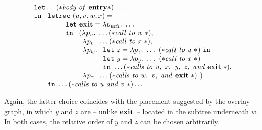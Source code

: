 \begin{description}
\begin{equation}
\begin{array}{l}
        \qquad \mathtt{let} \ldots (* \mathit{body\ of\ \entrynode}*)\ldots\\ 
        \qquad \mathtt{in}\
        \begin{array}[t]{l}
          \mathtt{letrec}\ (u,v,w,x) =\\
          \qquad \begin{array}[t]{l}
            \mathtt{let}\ \exitnode = 
            \lambda p_{\mathit{exit}}.\ \ldots\\
            \mathtt{in}\
            \begin{array}[t]{l}
              (%
              \lambda p_u.\ \ldots
              (*\mathit{call\ to\ w}\ *),\\
              \ \, \lambda p_v.\ \ldots
              (*\mathit{call\ to\ x}\ *),\\
              \ \, \lambda p_w.\ 
              \begin{array}[t]{l}
                \mathtt{let}\ z = \lambda p_z.\ 
                \ldots\ (*\mathit{call\ to\ u}\ *)\ \mathtt{in}\\
                \mathtt{let}\ y = \lambda p_y.\
                \ldots\ (*\mathit{call\ to\ x}\ *)\\ \mathtt{in}\ 
                \ldots
                (*\mathit{calls\ to\ u,\ x,\ y,\ z,\ and\ \exitnode}\ *),
              \end{array}\\
              \ \, \lambda p_x.\ \ldots
              (*\mathit{calls\ to\ w,\ v,\ and\ \exitnode}\ *)\ )
            \end{array}\\
          \end{array}\\
          \mathtt{in}\ \ldots (*\mathit{calls\ to\ u\ and\ v}\ *) \ldots
        \end{array}
      \end{array}
    \end{equation} 

    Again, the latter choice coincides with the placement suggested by
    the overlay graph, in which $y$ and $z$ are -- unlike $\mathbf{exit}$
    -- located in the subtree underneath $w$. In both cases, the
    relative order of $y$ and $z$ can be chosen arbitrarily.


\end{description}
